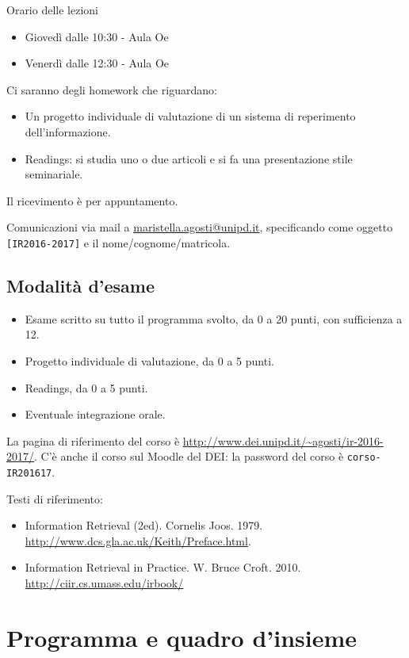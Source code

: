 Orario delle lezioni

\begin{itemize}
	\item Giovedì dalle 10:30 - Aula Oe
	\item Venerdì dalle 12:30 - Aula Oe
\end{itemize}

Ci saranno degli homework che riguardano:
\begin{itemize}
	\item Un progetto individuale di valutazione di un sistema di reperimento dell'informazione. 
	\item Readings:  si studia uno o due articoli e si fa una presentazione stile seminariale.
\end{itemize}

Il ricevimento è per appuntamento.

Comunicazioni via mail a \url{maristella.agosti@unipd.it}, specificando come oggetto \texttt{[IR2016-2017]} e il nome/cognome/matricola.


\subsection{Modalità d'esame}

\begin{itemize}
	\item Esame scritto su tutto il programma svolto, da 0 a 20 punti, con sufficienza a 12.
	\item Progetto individuale di valutazione, da 0 a 5 punti.
	\item Readings, da 0 a 5 punti.
	\item Eventuale integrazione orale.
\end{itemize}

La pagina di riferimento del corso è \url{http://www.dei.unipd.it/~agosti/ir-2016-2017/}. 
C'è anche il corso sul Moodle del DEI: la password del corso è \texttt{corso-IR201617}.

Testi di riferimento:
\begin{itemize}
	\item Information Retrieval (2ed). Cornelis Joos. 1979. \url{http://www.dcs.gla.ac.uk/Keith/Preface.html}.
	\item Information Retrieval in Practice. W. Bruce Croft. 2010. \url{http://ciir.cs.umass.edu/irbook/}
\end{itemize}


\section{Programma e quadro d'insieme}

